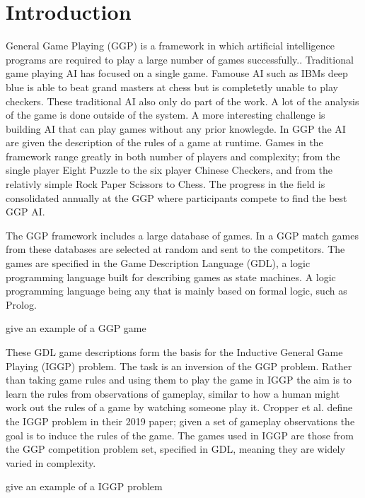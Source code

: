 
\chapter{Introduction}
General Game Playing (GGP) is a framework in which artificial intelligence programs are required to play a large number of games successfully.\cite{Genesereth/GGPOverview}. Traditional game playing AI has focused on a single game. Famouse AI such as IBMs deep blue is able to beat grand masters at chess but is completetly unable to play checkers. These traditional AI also only do part of the work. A lot of the analysis of the game is done outside of the system. A more interesting challenge is building AI that can play games without any prior knowlegde. In GGP the AI are given the description of the rules of a game at runtime. Games in the framework range greatly in both number of players and complexity; from the single player Eight Puzzle to the six player Chinese Checkers, and from the relativly simple Rock Paper Scissors to Chess\cite{GGP-Website}. The progress in the field is consolidated annually at the GGP where participants compete to find the best GGP AI. 

The GGP framework includes a large database of games. In a GGP match games from these databases are selected at random and sent to the competitors. The games are specified in the Game Description Language (GDL), a logic programming language built for describing games as state machines\cite{GDL_Spec}. A logic programming language being any that is mainly based on formal logic, such as Prolog.



\ac{give an example of a GGP game}


These GDL game descriptions form the basis for the Inductive General Game Playing (IGGP) problem. The task is an inversion of the GGP problem. Rather than taking game rules and using them to play the game in IGGP the aim is to learn the rules from observations of gameplay, similar to how a human might work out the rules of a game by watching someone play it. Cropper et al. define the IGGP problem in their 2019 paper; given a set of gameplay observations the goal is to induce the rules of the game\cite{Cropper/IGGP}. The games used in IGGP are those from the GGP competition problem set, specified in GDL, meaning they are widely varied in complexity.

\ac{give an example of a IGGP problem}


